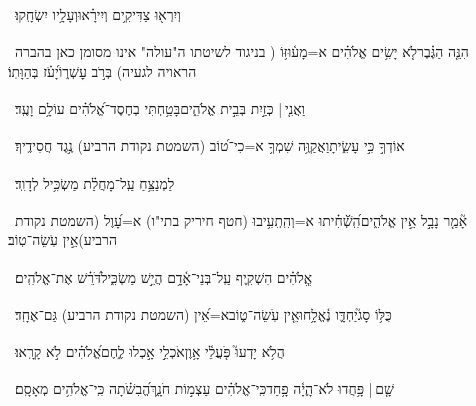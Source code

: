 \documentclass[12pt]{article}
\newcommand{\loc}[1]{\textsuperscript{\locf{#1}}}
\begin{document}
{\loc{ ח}~}‏וְיִרְא֖וּ צַדִּיקִ֥ים וְיִירָ֗אוּ{\hfill}וְעָלָ֥יו יִשְׂחָֽקוּ׃\par

{\loc{ ט}~}‏הִנֵּ֤ה הַגֶּ֗בֶר{\hfill}לֹ֤א יָשִׂ֥ים אֱלֹהִ֗ים א=מָע֫וּזּ֥וֹ ( בניגוד לשיטתו ה"עולה" אינו מסומן כאן בהברה הראויה לגעיה)\newline\hspace*{.5em} בְּרֹ֣ב עׇשְׁר֑וֹ{\hfill}יָ֝עֹ֗ז בְּהַוָּתֽוֹ׃\par

{\loc{ י}~}‏וַאֲנִ֤י |  כְּזַ֣יִת  בְּבֵ֣ית אֱלֹהִ֑ים{\hfill}בָּטַ֥חְתִּי בְחֶסֶד־אֱ֝לֹהִ֗ים עוֹלָ֥ם וָעֶֽד׃\par

{\loc{ יא}~}‏אוֹדְךָ֣  כִּ֣י עָשִׂ֑יתָ{\hfill}וַאֲקַוֶּ֥ה שִׁמְךָ֥ א=כִי־ט֝וֹב (השמטת נקודת הרביע) נֶ֣גֶד חֲסִידֶֽיךָ׃\par\pend
\ledpb
\pstart[\subsection*{\textcolor{red}{פרק נג}}]\label{פרק נג}
{\loc{ א}~}‏לַמְנַצֵּ֥חַ עַֽל־מָחֲלַ֗ת מַשְׂכִּ֥יל לְדָוִֽד׃\par

{\loc{ ב}~}‏אָ֘מַ֤ר נָבָ֣ל {\hfill}אֵ֣ין אֱלֹהִ֑ים\newline\hspace*{.5em}הִֽ֝שְׁﬞחִ֗יתוּ א=וְהִֽתְִעִ֥יבוּ (חטף חיריק בתי"ו) א=עָ֝וֶל (השמטת נקודת הרביע){\hfill}אֵ֣ין עֹֽשֵׂה־טֽוֹב׃\par

{\loc{ ג}~}‏אֱֽלֹהִ֗ים{\hfill} הִשְׁקִ֢יף עַֽל־בְּנֵי־אָ֫דָ֥ם\newline\hspace*{.5em} הֲיֵ֣שׁ מַשְׂכִּ֑יל{\hfill}דֹּ֝רֵ֗שׁ אֶת־אֱלֹהִֽים׃\par

{\loc{ ד}~}‏כֻּלּ֥וֹ סָג֮{\hfill}יַחְדָּ֢ו נֶ֫אֱלָ֥חוּ\newline\hspace*{.5em}אֵ֤ין עֹֽשֵׂה־ט֑וֹב{\hfill}א=אֵ֝ין (השמטת נקודת הרביע) גַּם־אֶחָֽד׃\par

{\loc{ ה}~}‏הֲלֹ֥א יָדְעוּ֮ פֹּ֤עֲלֵ֫י אָ֥וֶן{\hfill}אֹכְלֵ֣י \newline\hspace*{.5em}אָ֣כְלוּ לֶ֑חֶם{\hfill}אֱ֝לֹהִ֗ים לֹ֣א קָרָֽאוּ׃\par

{\loc{ ו}~}‏שָׁ֤ם |  פָּ֥חֲדוּ {\hfill}לֹא־הָ֢יָ֫ה פָ֥חַד\newline\hspace*{.5em}כִּֽי־אֱלֹהִ֗ים  עַצְמ֣וֹת חֹנָ֑ךְ{\hfill}הֱ֝בִשֹׁ֗תָה כִּֽי־אֱלֹהִ֥ים מְאָסָֽם׃\par
\end{document}
